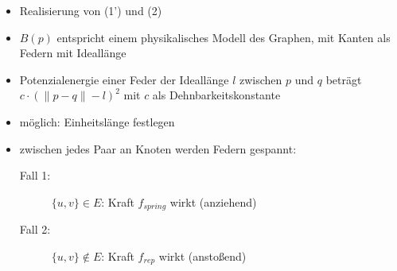 \begin{itemize}[itemsep=-1pt]
	\item Realisierung von (1') und (2)
	\item $B(p)$ entspricht einem physikalisches Modell des Graphen, mit Kanten als Federn mit Ideallänge
	\item Potenzialenergie einer Feder der Ideallänge $l$ zwischen $p$ und $q$ beträgt $c\cdot (\|p-q\|-l)^2$ mit $c$ als Dehnbarkeitskonstante
	\item möglich: Einheitslänge festlegen
	\item zwischen jedes Paar an Knoten werden Federn gespannt:
		\begin{description}
			\item[Fall 1:] $\{u,v\}\in E$: Kraft $f_{spring}$ wirkt (anziehend)
			\item[Fall 2:] $\{u,v\}\notin E$: Kraft $f_{rep}$ wirkt (anstoßend)
		\end{description}
\end{itemize}
\topbreak
\vspace*{-2\baselineskip}

